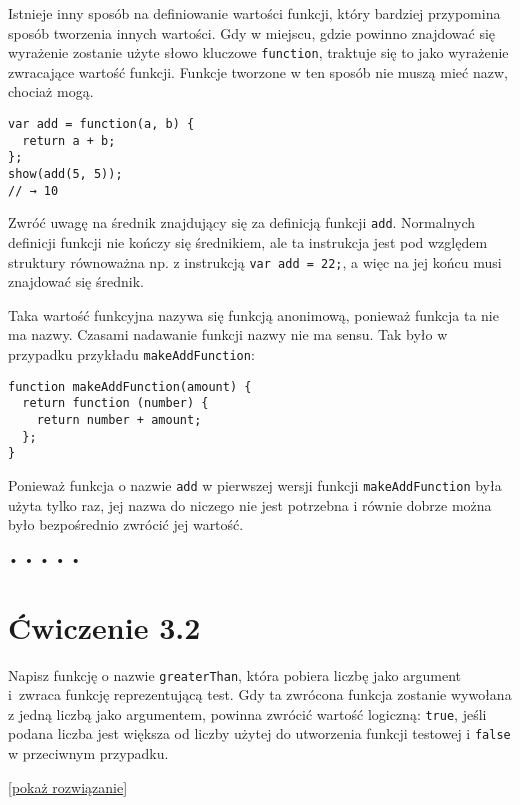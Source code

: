     
Istnieje inny sposób na definiowanie wartości funkcji, który bardziej przypomina sposób tworzenia innych wartości. Gdy w miejscu, gdzie powinno znajdować się wyrażenie zostanie użyte słowo kluczowe \texttt{function}, traktuje się to jako wyrażenie zwracające wartość funkcji. Funkcje tworzone w ten sposób nie muszą mieć nazw, chociaż mogą.

    
\begin{verbatim} 
var add = function(a, b) {
  return a + b;
};
show(add(5, 5));
// → 10
\end{verbatim}
    
Zwróć uwagę na średnik znajdujący się za definicją funkcji \texttt{add}. Normalnych definicji funkcji nie kończy się średnikiem, ale ta instrukcja jest pod względem struktury równoważna np. z instrukcją \texttt{var add = 22;}, a więc na jej końcu musi znajdować się średnik.

    
Taka wartość funkcyjna nazywa się funkcją anonimową, ponieważ funkcja ta nie ma nazwy. Czasami nadawanie funkcji nazwy nie ma sensu. Tak było w przypadku przykładu \texttt{makeAddFunction}:

    
\begin{verbatim} 
function makeAddFunction(amount) {
  return function (number) {
    return number + amount;
  };
}
 \end{verbatim}
    
Ponieważ funkcja o nazwie \texttt{add} w pierwszej wersji funkcji \texttt{makeAddFunction} była użyta tylko raz, jej nazwa do niczego nie jest potrzebna i równie dobrze można było bezpośrednio zwrócić jej wartość.

  
  
\begin{center}
• • • • •
\end{center}
  
    
\section*{Ćwiczenie 3.2}
\label{sec:3.2}
    
      
Napisz funkcję o nazwie \texttt{greaterThan}, która pobiera liczbę jako argument i~zwraca funkcję reprezentującą test. Gdy ta zwrócona funkcja zostanie wywołana z jedną liczbą jako argumentem, powinna zwrócić wartość logiczną: \texttt{true}, jeśli podana liczba jest większa od liczby użytej do utworzenia funkcji testowej i \texttt{false} w przeciwnym przypadku.

    
[\hyperref[sol:3.2]{pokaż rozwiązanie}]
    
